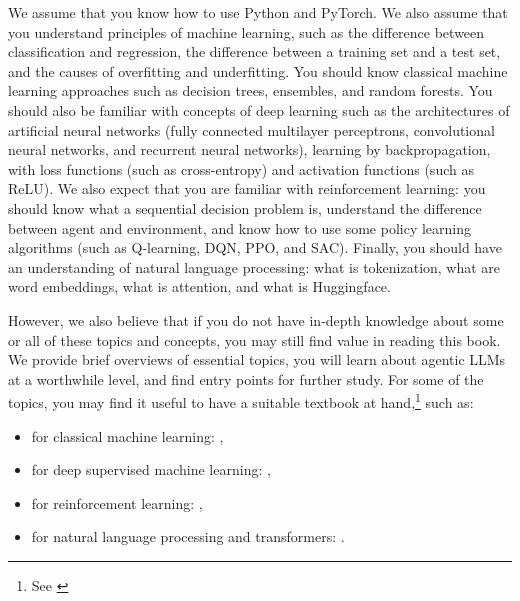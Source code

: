 We assume that you know how to use Python and PyTorch. We also assume that you understand principles of machine learning, such as the difference between classification and regression, the difference between a training set and a test set, and the causes of overfitting and underfitting. You should  know  classical machine learning approaches such as decision trees, ensembles, and random forests. You should also be familiar with concepts of deep learning such as the architectures of artificial neural networks (fully connected multilayer perceptrons, convolutional neural networks, and recurrent neural networks), learning by backpropagation, with loss functions (such as cross-entropy) and activation functions (such as ReLU). We also expect that you are familiar with reinforcement learning: you should know what a sequential decision problem is, understand the difference between agent and environment, and know how to use some policy learning algorithms (such as Q-learning, DQN, PPO, and SAC). Finally, you should have an understanding of natural language processing: what is tokenization, what are word embeddings, what is attention, and what is Huggingface.

However, we also believe that if you do not have in-depth knowledge about some or all of these topics and concepts, you may still find value in reading this book. We provide brief overviews of essential topics, %
you will learn about agentic LLMs at a worthwhile level,  and find entry points for further study.
For some of the topics, you may find it useful to have a suitable  textbook at hand,\footnote{See \citet{gunasekar2024textbooks}} such as:
\begin{itemize}
    \item 
for classical machine learning: \citet{alpaydin2021machine,flach2012machine}, 
\item for deep supervised  machine learning: \citet{bishop2023deep,goodfellow2016deep,chollet2021deep,stevens2020deep}, 
\item for reinforcement learning: \citet{sutton2018reinforcement,graesser2019foundations,plaat2022deep,franccois2018introduction}, 
\item for natural language processing and transformers:  \citet{jm3}.
\end{itemize}


